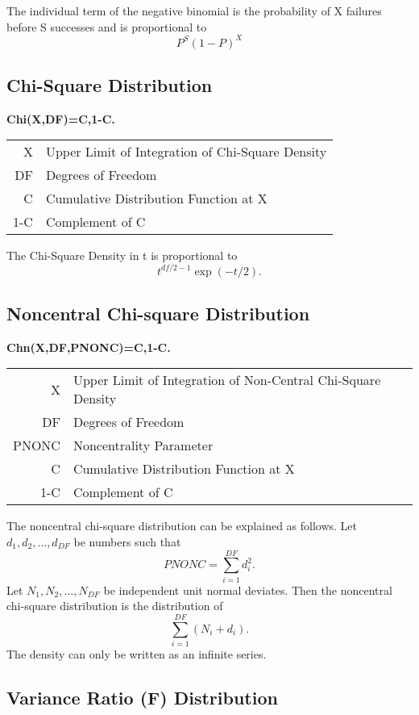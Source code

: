 \documentclass[12pt,dvips]{article}
\newcommand{\mysubsection}[1]
    {\color{green}\subsection{#1}\color{black}}
\begin{document}
     The individual term of the negative binomial is the probability of
     X failures before S successes and is proportional to
          \[ P^S  (1-P)^X \]
  
   
\mysubsection{Chi-Square Distribution}
     
{\bf \centering Chi(X,DF)=C,1-C.\\}

\begin{center}
\begin{tabular}{rl}
          X  & Upper Limit of Integration of Chi-Square Density\\
          DF & Degrees of Freedom\\
          C  & Cumulative Distribution Function at X\\
         1-C & Complement of C\\
\end{tabular}
\end{center}
     
     The Chi-Square Density in t is proportional to 
\[t^{df/2 - 1}  \exp(-t/2).\]
     
  
\mysubsection{Noncentral Chi-square Distribution}
     
{\bf \centering Chn(X,DF,PNONC)=C,1-C.\\}

\begin{center}
\begin{tabular}{rl}
       X     & Upper Limit of Integration of Non-Central Chi-Square Density\\
       DF    & Degrees of Freedom\\
       PNONC & Noncentrality Parameter\\
       C     & Cumulative Distribution Function at X\\
       1-C   & Complement of C\\
\end{tabular}
\end{center}

The noncentral chi-square distribution can be explained as follows.
Let $d_1, d_2, \ldots, d_{DF}$ be numbers such that
\[ PNONC = \sum_{i=1}^{DF} d_{i}^{2}. \]
Let $N_1, N_2, \ldots, N_{DF}$ be independent unit normal deviates.
Then the noncentral chi-square distribution is the distribution of
\[ \sum_{i=1}^{DF} ( N_i + d_i ).\]
The density can only be written as an infinite series.
     
\mysubsection{Variance Ratio (F) Distribution}
     
\end{document}
